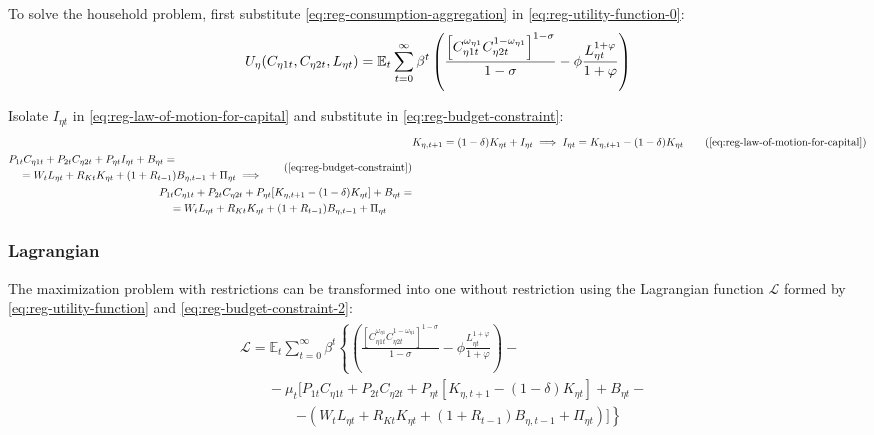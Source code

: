\documentclass[../thesis.tex]{subfiles}
\begin{document}
To solve the household problem, first substitute \ref{eq:reg-consumption-aggregation} in \ref{eq:reg-utility-function-0}:
\begin{align}
	U_{\eta}(C_{\eta 1 t}, C_{\eta 2 t}, L_{\eta t}) = {\mathbb{E}_{t}} \sum_{t=0}^{\infty} \beta^t \left( \frac{\left[ C_{\eta 1 t}^{\omega_{\eta 1}} C_{\eta 2 t}^{1-\omega_{\eta 1}} \right]^{1-\sigma}}{1-\sigma} - \phi \frac{L_{\eta t}^{1+\varphi}}{1+\varphi} \right) \label{eq:reg-utility-function}
\end{align}

Isolate $I_{\eta t}$ in \ref{eq:reg-law-of-motion-for-capital} and substitute in \ref{eq:reg-budget-constraint}:
\begin{align}
	& K_{\eta, t+1} = (1-\delta)K_{\eta t} + I_{\eta t} \implies I_{\eta t} = K_{\eta, t+1} - (1-\delta)K_{\eta t} \tag{\ref{eq:reg-law-of-motion-for-capital}} \\
	\begin{split}
		& P_{1 t} C_{\eta 1 t} + P_{2 t} C_{\eta 2 t} + P_{\eta t} I_{\eta t} + B_{\eta t} = \\ & \quad = W_t L_{\eta t} + R_{Kt} K_{\eta t} + (1 + R_{t-1}) B_{\eta,t-1} + \Pi_{\eta t} \implies
	\end{split} \tag{\ref{eq:reg-budget-constraint}}
	\\
	\begin{split}
		& P_{1 t} C_{\eta 1 t} + P_{2 t} C_{\eta 2 t} + P_{\eta t} [ K_{\eta, t+1} - (1-\delta)K_{\eta t} ] + B_{\eta t} = \\ & \quad = W_t L_{\eta t} + R_{Kt} K_{\eta t} + (1 + R_{t-1}) B_{\eta,t-1} + \Pi_{\eta t}
	\end{split} \label{eq:reg-budget-constraint-2}
\end{align}

\subsubsection*{Lagrangian}

The maximization problem with restrictions can be transformed into one without restriction using the Lagrangian function $\mathcal{L}$ formed by \ref{eq:reg-utility-function} and \ref{eq:reg-budget-constraint-2}:
\begin{align}
	\begin{split}
	& \mathcal{L} = \mathbb{E}_t \sum_{t=0}^{\infty} \beta^t \left\{ \left( \frac{ \left[ C_{\eta 1 t}^{\omega_{\eta 1}} C_{\eta 2 t}^{1-\omega_{\eta 1}} \right]^{1 -\sigma}}{1 -\sigma} - \phi \frac{L_{\eta t}^{1+\varphi}}{1+\varphi} \right) \right. - \\ & \qquad - \mu_t \Big[ P_{1 t} C_{\eta 1 t} + P_{2 t} C_{\eta 2 t} + P_{\eta t} [ K_{\eta, t+1} - (1-\delta)K_{\eta t} ] + B_{\eta t} - \\ & \qquad \qquad \left. - ( W_t L_{\eta t} + R_{Kt} K_{\eta t} + (1 + R_{t-1}) B_{\eta,t-1} + \Pi_{\eta t} ) \Big] \right\} \label{eq:reg-household-lagrangian}
	\end{split}
\end{align}
\end{document}
